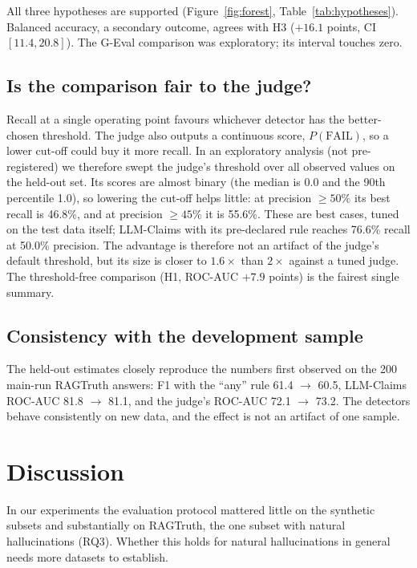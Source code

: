 \documentclass[11pt,a4paper]{article}
\begin{document}
All three hypotheses are supported (Figure~\ref{fig:forest},
Table~\ref{tab:hypotheses}). Balanced accuracy, a secondary outcome, agrees with H3
($+16.1$ points, CI $[11.4, 20.8]$). The G-Eval comparison was exploratory; its interval
touches zero.

\subsection{Is the comparison fair to the judge?}

Recall at a single operating point favours whichever detector has the better-chosen
threshold. The judge also outputs a continuous score, $P(\text{FAIL})$, so a lower
cut-off could buy it more recall. In an exploratory analysis (not pre-registered) we
therefore swept the judge's threshold over all observed values on the held-out set. Its
scores are almost binary (the median is 0.0 and the 90th percentile 1.0), so lowering the
cut-off helps little: at precision $\geq 50\%$ its best recall is 46.8\%, and at
precision $\geq 45\%$ it is 55.6\%. These are best cases, tuned on the test data itself;
LLM-Claims with its pre-declared rule reaches 76.6\% recall at 50.0\% precision. The
advantage is therefore not an artifact of the judge's default threshold, but its size is
closer to $1.6\times$ than $2\times$ against a tuned judge. The threshold-free comparison
(H1, ROC-AUC $+7.9$ points) is the fairest single summary.

\subsection{Consistency with the development sample}

The held-out estimates closely reproduce the numbers first observed on the 200 main-run
RAGTruth answers: F1 with the ``any'' rule 61.4 $\rightarrow$ 60.5, LLM-Claims ROC-AUC
81.8 $\rightarrow$ 81.1, and the judge's ROC-AUC 72.1 $\rightarrow$ 73.2. The detectors
behave consistently on new data, and the effect is not an artifact of one sample.

\section{Discussion}
\label{sec:discussion}

In our experiments the evaluation protocol mattered little on the synthetic subsets and
substantially on RAGTruth, the one subset with natural hallucinations (RQ3). Whether
this holds for natural hallucinations in general needs more datasets to establish.
\end{document}
